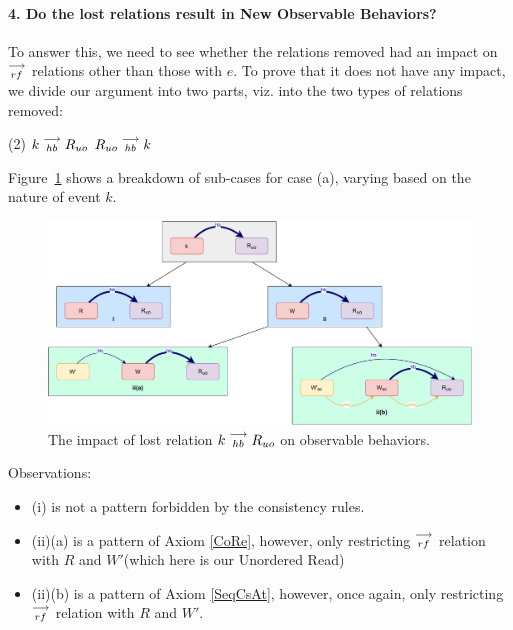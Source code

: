 \paragraph{4. Do the lost relations result in New Observable Behaviors?}

        To answer this, we need to see whether the relations removed had an impact on $\stackrel{\longrightarrow}{_{rf}}$ relations other than those with $e$. To prove that it does not have any impact, we divide our argument into two parts, viz. into the two types of relations removed:

        \begin{tasks}(2)
            \task $k\stackrel{\longrightarrow}{_{hb}}R_{uo}$ 
            \task $R_{uo}\stackrel{\longrightarrow}{_{hb}}k$ 
        \end{tasks}

        Figure~\ref{elim_read:case1} shows a breakdown of sub-cases for case (a), varying based
        on the nature of event $k$.
        \begin{figure}[H]
            \centering
            \includegraphics[scale=0.5]{6.Elimination/1.ValidEliminationCandidate/ReadElimProof/ProofParts/Part4_Case1.pdf}
            \caption{The impact of lost relation $k\stackrel{\longrightarrow}{_{hb}}R_{uo}$ on observable behaviors.}
            \label{elim_read:case1}
        \end{figure}

        Observations:
        \begin{itemize}
            \item (i) is not a pattern forbidden by the consistency rules.
            \item (ii)(a) is a pattern of Axiom \ref{CoRe}, however, only restricting $\stackrel{\longrightarrow}{_{rf}}$ relation with $R$ and $W'$(which here is our Unordered Read)
            \item (ii)(b) is a pattern of Axiom \ref{SeqCsAt}, however, once again, only restricting $\stackrel{\longrightarrow}{_{rf}}$ relation with $R$ and $W'$. 
        \end{itemize}

